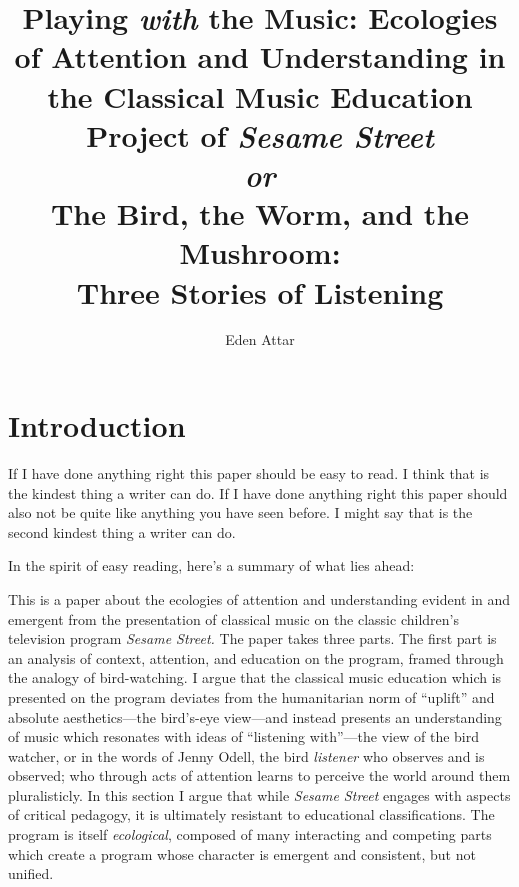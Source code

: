 \documentclass[12pt,letterpaper]{article}
\begin{document}
	
	\title{Playing \textit{with} the Music: Ecologies of Attention and 
	Understanding in the Classical Music Education Project of 
	\textit{Sesame Street}\\
	\vspace*{12pt}
	\large
	\textit{or}\\
	\vspace*{12pt}
	\Large
	The Bird, the Worm, and the Mushroom:\\ Three Stories of Listening}
	\author{Eden Attar}
	\maketitle
	\doublespacing
	\thispagestyle{empty}
	\newpage
	\clearpage
	\setcounter{page}{1}
	\thispagestyle{empty}
	\frenchspacing
	
	\section*{Introduction}	

	If I have done anything right this paper should be easy to read. I
	think that is the kindest thing a writer can do. If I have
	done anything right this paper should also not be quite like anything 
	you have seen before. I might say that is the second kindest thing a 
	writer can do.  

	In the spirit of easy reading, here's a summary of what lies ahead:

	This is a paper about the ecologies of attention and understanding 
	evident in and emergent from the presentation of classical music on the
	classic children's television program \textit{Sesame Street.}  
	The paper takes three parts. The first part is an analysis of context,
	attention, and education on the program, framed through the analogy of
	bird-watching. I argue that the classical music education which is 
	presented on the program deviates from the humanitarian norm of 
	``uplift'' and absolute aesthetics---the bird's-eye view---and instead
	presents an understanding of music which resonates with ideas of 
	``listening with''---the view of the bird watcher, or in the words of
	Jenny Odell, the bird \textit{listener} who observes and is observed;
	who through acts of attention learns to perceive the world around them
	pluralisticly. In this section I argue that while \textit{Sesame
	Street} engages with aspects of critical pedagogy, it is ultimately 
	resistant to educational classifications. The program is itself
	\textit{ecological}, composed of many interacting and competing parts
	which create a program whose character is emergent and consistent, but
	not unified.   
\end{document}
